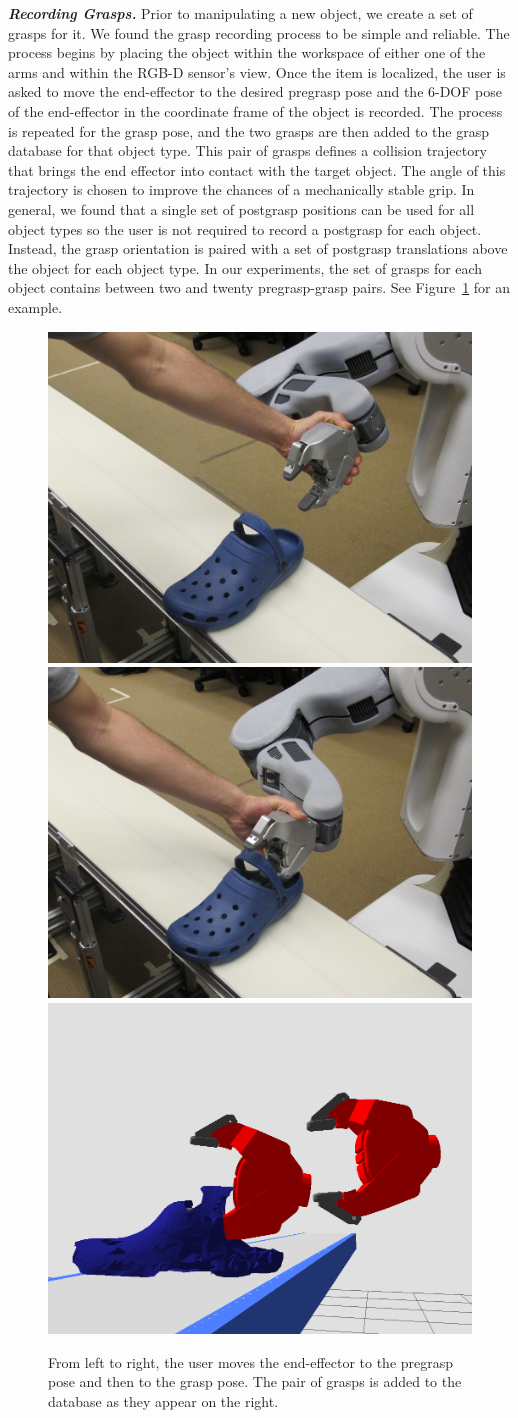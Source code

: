 \documentclass[letterpaper, 10 pt, conference]{ieeeconf}  %
\begin{document}
\textit{\textbf{Recording Grasps.}}  Prior to manipulating a new
object, we create a set of grasps for it. We found the grasp recording
process to be simple and reliable. The process begins by placing the
object within the workspace of either one of the arms and within the
RGB-D sensor's view. Once the item is localized, the user is asked to
move the end-effector to the desired pregrasp pose and the 6-DOF pose
of the end-effector in the coordinate frame of the object is
recorded. The process is repeated for the grasp pose, and the two
grasps are then added to the grasp database for that object type. This
pair of grasps defines a collision trajectory that brings the end
effector into contact with the target object. The angle of this
trajectory is chosen to improve the chances of a mechanically stable
grip. In general, we found that a single set of postgrasp positions
can be used for all object types so the user is not required to record
a postgrasp for each object.  Instead, the grasp orientation is paired
with a set of postgrasp translations above the object for each object
type. In our experiments, the set of grasps for each object contains
between two and twenty pregrasp-grasp pairs. See
Figure~\ref{fig:recording_grasps-photo} for an example.

\begin{figure}[t]
\centering
\includegraphics[width=0.31\columnwidth]{figures/croc-record_pregrasp.jpg}
\includegraphics[width=0.31\columnwidth]{figures/croc-record_grasp.jpg}
\includegraphics[width=0.31\columnwidth]{figures/croc-grasps-outside_view.png}
\caption{
From left to right, the user moves the end-effector to the pregrasp pose and then to the grasp pose. The pair of grasps is added to the database as they appear on the right.
}
\label{fig:recording_grasps-photo}
\end{figure}
\end{document}

